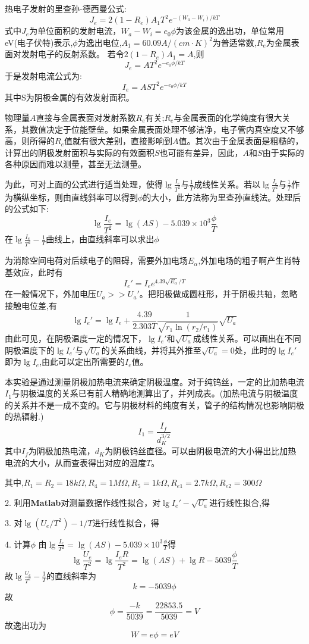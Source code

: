 \documentclass[UTF8]{article}
\begin{document}
{
	热电子发射的里查孙-德西曼公式:
	$$J_e = 2(1-R_e)A_1T^2e^{-(W_a-W_i)/kT}$$
	式中$J_e$为单位面积的发射电流，$W_a-W_i=e_0\phi$为该金属的逸出功，单位常用eV(电子伏特)表示,$\phi$为逸出电位,$A_1=60.09A/(cm\cdot K)^2$为普适常数,$R_e$为金属表面对发射电子的反射系数。
	若令$2(1-R_e)A_1 = A$,则
	$$J_e = AT^2e^{-e_0\phi/kT}$$
	于是发射电流公式为:$$I_e = AST^2e^{-e_0\phi/kT}$$
	其中S为阴极金属的有效发射面积。
	
	物理量$A$直接与金属表面对发射系数$R_e$有关;$R_e$与金属表面的化学纯度有很大关系，其数值决定于位能壁垒。如果金属表面处理不够洁净，电子管内真空度又不够高，则所得的$R_e$值就有很大差别，直接影响到$A$值。其次由于金属表面是粗糙的，计算出的阴极发射面积与实际的有效面积$S$也可能有差异，因此，$A$和$S$由于实际的各种原因而难以测量，甚至无法测量。
	
	
	为此，可对上面的公式进行适当处理，使得$\lg{\frac{I_e}{T^2}}$与$\frac{1}{T}$成线性关系。若以$\lg{\frac{I_e}{T^2}}$与$\frac{1}{T}$作为横纵坐标，则由直线斜率可以得到$\phi$的大小，此方法称为里查孙直线法。处理后的公式如下:
	$$\lg{\frac{I_e}{T^2}} = \lg(AS) - 5.039\times10^3\frac{\phi}{T}$$
	在$\lg{\frac{I_e}{T^2}}-\frac{1}{T}$曲线上，由直线斜率可以求出$\phi$
	
	为消除空间电荷对后续电子的阻碍，需要外加电场$E_\alpha$,外加电场的粗子啊产生肖特基效应，此时有
	$$I_e' = I_e e^{4.39\sqrt{E_\alpha}/T}$$
	在一般情况下，外加电压$U_a>>U_a'$。把阳极做成圆柱形，并于阴极共轴，忽略接触电位差,有
	$$\lg I_e' = \lg I_e + \frac{4.39}{2.303T}\frac{1}{\sqrt{r_1\ln(r_2/r_1)}}\sqrt{U_a}$$
	由此可见，在阴极温度一定的情况下，$\lg I_e'$和$\sqrt{U_a}$成线性关系。可以画出在不同阴极温度下的$\lg I_e'$与$\sqrt{U_a}$的关系曲线，并将其外推至$\sqrt{U_a}=0$处，此时的$\lg I_e'$即为$\lg I_e$,由此可以定出所需要的$I_e$值。
	
	
	本实验是通过测量阴极加热电流来确定阴极温度。对于纯钨丝，一定的比加热电流$I_1$与阴极温度的关系已有前人精确地测算出了，并列成表。(加热电流与阴极温度的关系并不是一成不变的。它与阴极材料的纯度有关，管子的结构情况也影响阴极的热辐射.)
	$$I_1 = \frac{I_f}{d_K^{3/2}}$$
	其中$I_f$为阴极加热电流，$d_K$为阴极钨丝直径。可以由阴极电流的大小得出比加热电流的大小，从而查表得出对应的温度$T$。
	
	其中,$R_1=R_2=18k\Omega, R_4=1M\Omega, R_5 = 1k\Omega, R_{e1} = 2.7k\Omega, R_{e2}=300\Omega$
	
	2. 利用\textbf{Matlab}对测量数据作线性拟合，对$\lg I_e'-\sqrt{U_a}$进行线性拟合,得
	
	3. 对$\lg(U_e/T^2)-1/T$进行线性拟合，得
	
	4. 计算$\phi$
	由$\lg\frac{I_e}{T^2} = \lg(AS) - 5.039\times10^3\frac{\phi}{T}$得
	$$\lg\frac{U_e}{T^2} = \lg\frac{I_eR}{T^2} = \lg(AS) + \lg R - 5039\frac{\phi}{T}$$
	故$\lg\frac{U_e}{T^2}-\frac{1}{T}$的直线斜率为
	$$k = -5039\phi$$
	故
	$$\phi = \frac{-k}{5039} = \frac{22853.5}{5039} = V$$
	故逸出功为
	$$W = e\phi = eV$$
	
}
\end{document}

